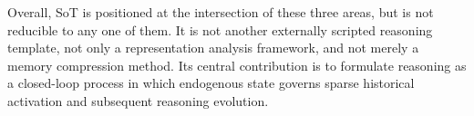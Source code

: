 Overall, SoT is positioned at the intersection of these three areas, but is not reducible to any one of them. It is not another externally scripted reasoning template, not only a representation analysis framework, and not merely a memory compression method. Its central contribution is to formulate reasoning as a closed-loop process in which endogenous state governs sparse historical activation and subsequent reasoning evolution.

